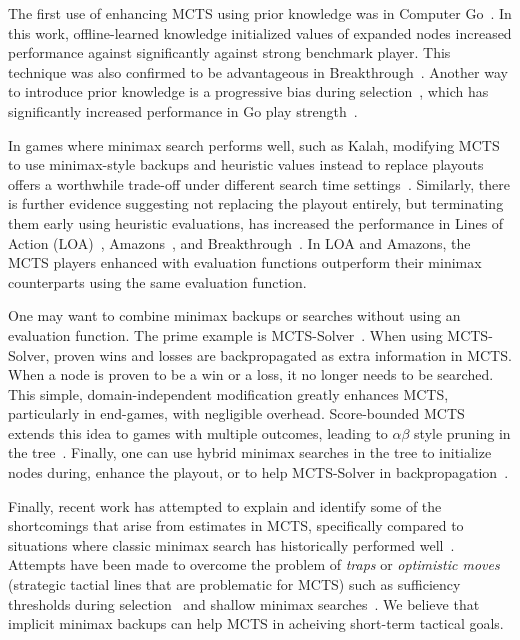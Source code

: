 \documentclass[letterpaper]{article}
\begin{document}
The first use of enhancing MCTS using prior knowledge was in Computer Go~\cite{Gelly07Combining}. 
In this work, offline-learned knowledge initialized values of expanded nodes increased performance against significantly against 
strong benchmark player. This technique was also confirmed to be advantageous in Breakthrough~\cite{Lorentz13Breakthrough}. 
Another way to introduce prior knowledge is a progressive bias during selection~\cite{Chaslot08Progressive}, which has 
significantly increased performance in Go play strength~\cite{Gelly07Combining}. 

In games where minimax search performs well, such as Kalah, 
modifying MCTS to use minimax-style backups and heuristic values instead to replace playouts offers a worthwhile trade-off 
under different search time settings~\cite{Ramanujan11Tradeoffs}.
Similarly, there is further evidence suggesting not replacing the playout entirely, but terminating them early 
using heuristic evaluations, has increased the performance in Lines of Action (LOA)~\cite{Winands10MCTS-LOA}, 
Amazons~\cite{Kloetzer10Amazons,Lorentz08Amazons}, and Breakthrough~\cite{Lorentz13Breakthrough}. In LOA and Amazons, the 
MCTS players enhanced with evaluation functions outperform their minimax counterparts using the same evaluation function.


One may want to combine minimax backups or searches without using an evaluation function. 
The prime example is MCTS-Solver~\cite{Winands08Solver}. When using 
MCTS-Solver, proven wins and losses are backpropagated as extra information in MCTS. When a node is proven to be a 
win or a loss, it no longer needs to be searched. This simple, domain-independent modification greatly enhances 
MCTS, particularly in end-games, with negligible overhead. Score-bounded MCTS extends this idea to games with multiple 
outcomes, leading to $\alpha \beta$ style pruning in the tree~\cite{Cazenave10ScoreBounded}. Finally, one can use hybrid
minimax searches in the tree to initialize nodes during, enhance the playout, or to help MCTS-Solver 
in backpropagation~\cite{Baier13MinimaxHybrids}.

Finally, recent work has attempted to explain and identify some of the shortcomings that arise from estimates in 
MCTS, specifically compared to situations where classic minimax search has historically performed 
well~\cite{Ramanujan10Understanding,Ramanujan10On}. 
Attempts have been made to overcome the problem of {\it traps} or {\it optimistic moves} (strategic  
tactial lines that are problematic for MCTS) such as sufficiency thresholds during selection~\cite{Gudmindsson13Sufficiency} 
and shallow minimax searches~\cite{Baier13MinimaxHybrids}. We believe that implicit minimax backups can help MCTS in acheiving
short-term tactical goals. 
\end{document}
